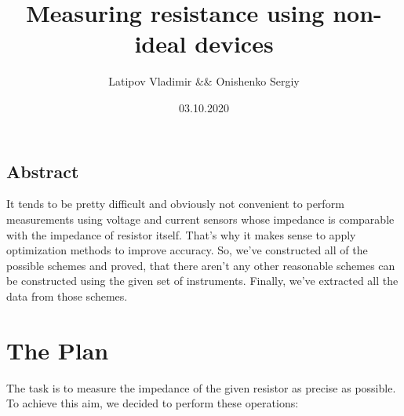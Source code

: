 \documentclass[11pt]{memoir}
\title{\textbf{\Huge{Measuring resistance using non-ideal devices}}}
\date{03.10.2020}
\author{Latipov Vladimir \&\& Onishenko Sergiy}
\begin{document}
    \renewcommand{\thesection}{\arabic{section}}

    \maketitle
    \newpage

    \tableofcontents

    \newpage


    \begin{vplace}
    \begin{center}

\section{Abstract}\label{sec:abstract}
        It tends to be pretty difficult and obviously not convenient to perform measurements using voltage and current sensors whose impedance is comparable with the impedance of resistor itself.\newline
        That's why it makes sense to apply optimization methods to improve accuracy.\newline
        So, we've constructed all of the possible schemes and proved, that there aren't any other reasonable schemes can be constructed using the given set of instruments.\newline
        Finally, we've extracted all the data from those schemes.\newline

    \end{center}
    \end{vplace}

    \newpage

\section{The Plan}\label{sec:the-plan}
    The task is to measure the impedance of the given resistor as precise as possible.\newline
    To achieve this aim, we decided to perform these operations:\newline
\end{document}
